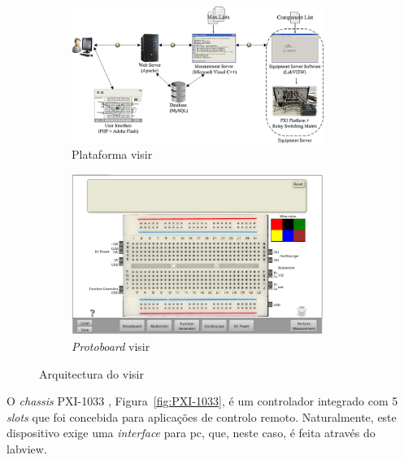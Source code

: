 \begin{figure}[hbtp]
    \centering
    \begin{subfigure}[hbtp]{0.48\textwidth}
        \centering
        \includegraphics[width=0.9\textwidth]{figures/arquitectura_VISIR.png}
        \caption{Plataforma \acrshort{visir} \cite{tawfikexperiences}}
        \label{fig:platvisir}
    \end{subfigure}
    \begin{subfigure}[hbtp]{0.48\textwidth}
        \includegraphics[width=0.9\textwidth]{figures/protboard_visir.png}
        \caption{\textit{Protoboard} \acrshort{visir}}
        \label{fig:protoboadrvisir}
    \end{subfigure}
    \caption{Arquitectura do \acrshort{visir}}
    \label{fig:arquitecturavisir}
\end{figure}

O \textit{chassis} PXI-1033 \cite{PXI-1033}, Figura~\ref{fig:PXI-1033}, é um controlador integrado com 5 \textit{slots} que foi concebida para aplicações de controlo remoto. Naturalmente, este dispositivo exige uma \textit{interface} para \acrshort{pc}, que, neste caso, é feita através do \acrshort{labview}.

